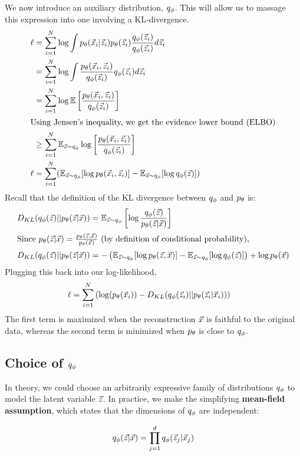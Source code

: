 We now introduce an auxiliary distribution, $q_\phi$. This will allow us to massage this expression into one involving a KL-divergence.
\begin{align*}
    \ell &= \sum_{i=1}^N\log\int p_\theta(\vec{x}_i|\vec{z}_i)p_\theta(\vec{z}_i)\frac{q_\phi(\vec{z}_i)}{q_\phi(\vec{z}_i)}d\vec{z}_i \\
    &= \sum_{i=1}^N\log\int\frac{p_\theta(\vec{x}_i,\vec{z}_i)}{q_\phi(\vec{z}_i)}q_\phi(\vec{z}_i)d\vec{z}_i \\
    &= \sum_{i=1}^N\log\mathbb{E}\left[\frac{p_\theta(\vec{x}_i,\vec{z}_i)}{q_\phi(\vec{z}_i)}\right] \\
    \intertext{Using Jensen's inequality, we get the evidence lower bound (ELBO)}
    &\geq \sum_{i=1}^N\mathbb{E}_{\vec{z}\sim q_\phi}\log\left[\frac{p_\theta(\vec{x}_i,\vec{z}_i)}{q_\phi(\vec{z}_i)}\right] \\
    \ell &= \sum_{i=1}^N(\mathbb{E}_{\vec{z}\sim q_\phi}[\log p_\theta(\vec{x}_i, \vec{z}_i)] - \mathbb{E}_{\vec{z}\sim q_\phi}[\log q_\phi(\vec{z})])
\end{align*}
Recall that the definition of the KL divergence between $q_\phi$ and $p_\theta$ is:
\begin{align*}
    D_{KL}(q_\phi(\vec{z})||p_\theta(\vec{z}|\vec{x})) &= \mathbb{E}_{\vec{z}\sim q_\phi}\left[ \log\frac{q_\phi(\vec{z})}{p_\theta(\vec{z}|\vec{x})} \right] \\
    \intertext{Since $p_\theta(\vec{z}|\vec{x}) = \frac{p_\theta(\vec{z},\vec{x})}{p_\theta(\vec{x})}$ (by definition of conditional probability),}
    D_{KL}(q_\phi(\vec{z})||p_\theta(\vec{z}|\vec{x})) &= -\left( \mathbb{E}_{\vec{z}\sim q_\phi}[\log p_\theta(\vec{z},\vec{x})] - \mathbb{E}_{\vec{z}\sim q_\phi}[\log q_\phi(\vec{z})]\right) + \log p_\theta(\vec{x})
\end{align*}
Plugging this back into our log-likelihood,
\begin{align*}
    \ell &= \sum_{i=1}^N\left( \log(p_\theta(\vec{x}_i)) - D_{KL}(q_\phi(\vec{z}_i)||p_\theta(\vec{z}_i|\vec{x}_i)) \right)
\end{align*}
The first term is maximized when the reconstruction $\vec{x}$ is faithful to the original data, whereas the second term is minimized when $p_\theta$ is close to $q_\phi$.

\subsection{Choice of $q_\phi$}

In theory, we could choose an arbitrarily expressive family of distributions $q_\phi$ to model the latent variable $\vec{z}$. In practice, we make the simplifying {\bf mean-field assumption}, which states that the dimensions of $q_\phi$ are independent:

\begin{align*}
    q_\phi(\vec{z}|\vec{x}) = \prod_{j=1}^dq_\phi(\vec{z}_j|\vec{x}_j)
\end{align*}

